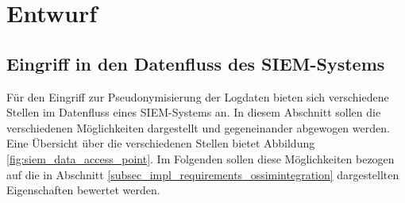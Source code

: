 \section{Entwurf}

\label{sec_impl_architecture}


\subsection{Eingriff in den Datenfluss des SIEM-Systems}


Für den Eingriff zur Pseudonymisierung der Logdaten bieten sich verschiedene Stellen im Datenfluss eines SIEM-Systems an. In diesem Abschnitt sollen die verschiedenen Möglichkeiten dargestellt und gegeneinander abgewogen werden. Eine Übersicht über die verschiedenen Stellen bietet Abbildung \ref{fig:siem_data_access_point}. Im Folgenden sollen diese Möglichkeiten bezogen auf die in Abschnitt \ref{subsec_impl_requirements_ossimintegration} dargestellten Eigenschaften bewertet werden.


